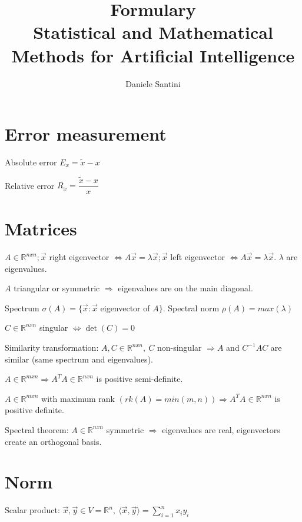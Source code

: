 \documentclass[]{article}
\title{Formulary \\ \large Statistical and Mathematical Methods for Artificial Intelligence}
\author{Daniele Santini}
\begin{document}
	
	
	\section{Error measurement}
	
	Absolute error $E_x = \tilde{x} - x$
	
	Relative error $R_x = \dfrac{\tilde{x} - x}{x}$
	
	\section{Matrices}
	
	$A \in \mathbb{R}^{nxn}; \vec{x}$ right eigenvector $\Leftrightarrow A \vec{x} = \lambda \vec{x}; \vec{x}$ left eigenvector $\Leftrightarrow A \vec{x} = \lambda \vec{x}$. $\lambda$ are eigenvalues.
	
	$A$ triangular or symmetric $\Rightarrow$ eigenvalues are on the main diagonal.
	
	Spectrum $\sigma(A) = \{\vec{x}: \vec{x}$ eigenvector of $A\}$.
	Spectral norm $\rho(A) = max(\lambda)$
	
	$C \in \mathbb{R}^{nxn}$ singular $\Leftrightarrow \det(C)=0$
	
	Similarity transformation: $A, C \in \mathbb{R}^{nxn}, \ C$ non-singular $\Rightarrow A$ and $C^{-1} A C$ are similar (same spectrum and eigenvalues).
	
	
	
	
	
	
	$A \in \mathbb{R}^{mxn} \Rightarrow A^T A \in \mathbb{R}^{nxn}$ is positive semi-definite.
	
	$A \in \mathbb{R}^{mxn}$ with maximum rank $(rk(A)=min(m,n)) \Rightarrow A^T A \in \mathbb{R}^{nxn}$ is positive definite.
	
	Spectral theorem: $A \in \mathbb{R}^{nxn}$ symmetric $\Rightarrow$ eigenvalues are real, eigenvectors create an orthogonal basis.
	
	\section{Norm}
	
	Scalar product: $\vec{x},\vec{y} \in V=\mathbb{R}^n, \ \langle \vec{x},\vec{y} \rangle = \sum\limits_{i=1}^{n} x_i y_i$
	
\end{document}
